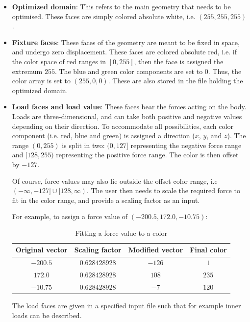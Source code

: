 \begin{itemize}
	\item \textbf{Optimized domain}: This refers to the main geometry that needs to be optimised. These faces are simply colored absolute white, i.e. $(255, 255, 255)$.
	\item \textbf{Fixture faces}: These faces of the geometry are meant to be fixed in space, and undergo zero displacement. These faces are colored absolute red, i.e. if the color space of red ranges in {$[0, 255]$}, then the face is assigned the extremum $255$. The blue and green color components are set to $0$. Thus, the color array is set to $(255, 0, 0)$. These are also stored in the file holding the optimized domain.
	\item \textbf{Load faces and load value}: These faces bear the forces acting on the body. Loads are three-dimensional, and can take both positive and negative values depending on their direction. To accommodate all possibilities, each color component (i.e. red, blue and green) is assigned a direction ($x$, $y$, and $z$). The range $(0, 255)$ is split in two: $(0, 127]$ representing the negative force range and $[128, 255)$ representing the positive force range. The color is then offset by $-127$. 

Of course, force values may also lie outside the offset color range, i.e $(-\infty, -127] \cup [128, \infty)$. The user then needs to scale the required force to fit in the color range, and provide a scaling factor as an input.

For example, to assign a force value of $(-200.5, 172.0, -10.75)$:

\begin{table}[h!]
	\begin{center}
		\caption{Fitting a force value to a color}
		\label{LoadFaceExample}
		\begin{tabular}{cccc}
			\toprule
			{\small Original vector} & {\small Scaling factor} & {\small Modified vector} & {\small Final color}\\
			\midrule
			$-200.5$ & $0.628428928$ & $-126$ & $1$\\
			$172.0$  & $0.628428928$ & $108$  & $235$\\
			$-10.75$ & $0.628428928$ & $-7$   & $120$\\
			\bottomrule
		\end{tabular}
	\end{center}
\end{table}

The load faces are given in a specified input file such that for example inner loads can be described.


\end{itemize}
